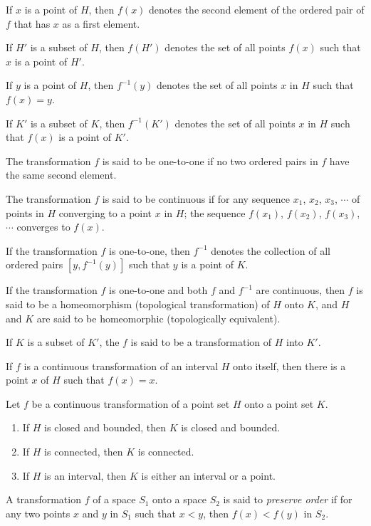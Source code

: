 \documentclass{article}
\begin{document}
\begin{description}
     If $x$ is a point of $H$, then $f(x)$ denotes the second element of the ordered pair of $f$ that has $x$ as a first element.

     If $H'$ is a subset of $H$, then $f(H')$ denotes the set of all points $f(x)$ such that $x$ is a point of $H'$.

     If $y$ is a point of $H$, then $f^{-1}(y)$ denotes the set of all points $x$ in $H$ such that $f(x)=y$.

     If $K'$ is a subset of $K$, then $f^{-1}(K')$ denotes the set of all points $x$ in $H$ such that $f(x)$ is a point of $K'$.

     The transformation $f$ is said to be one-to-one if no two ordered pairs in $f$ have the same second element.

     The transformation $f$ is said to be continuous if for any sequence $x_{1}$, $x_{2}$, $x_{3}$, $\cdots$ of points in $H$ converging to a point $x$ in $H$; the sequence $f(x_{1})$, $f(x_{2})$, $f(x_{3})$, $\cdots$ converges to $f(x)$.

     If the transformation $f$ is one-to-one, then $f^{-1}$ denotes the collection of all ordered pairs $[y,f^{-1}(y)]$ such that $y$ is a point of $K$.

     If the transformation $f$ is one-to-one and both $f$ and $f^{-1}$ are continuous, then $f$ is said to be a homeomorphism (topological transformation) of $H$ onto $K$, and $H$ and $K$ are said to be homeomorphic (topologically equivalent).

     If $K$ is a subset of $K'$, the $f$ is said to be a transformation of $H$ into $K'$.
  \item[Theorem 72:] If $f$ is a continuous transformation of an interval $H$ onto itself, then there is a point $x$ of $H$ such that $f(x)=x$.
  \item[Theorem 73:] Let $f$ be a continuous transformation of a point set $H$ onto a point set $K$.
    \begin{enumerate}[(1)]
      \item If $H$ is closed and bounded, then $K$ is closed and bounded.
      \item If $H$ is connected, then $K$ is connected.
      \item If $H$ is an interval, then $K$ is either an interval or a point.
    \end{enumerate}
  \item[Definition:] A transformation $f$ of a space $S_{1}$ onto a space $S_{2}$ is said to \emph{preserve order} if for any two points $x$ and $y$ in $S_{1}$ such that $x<y$, then $f(x) < f(y)$ in $S_{2}$.


\end{description}
\end{document}
